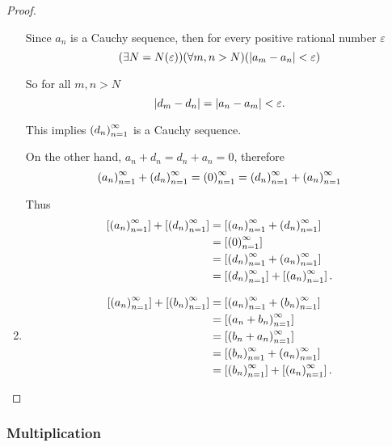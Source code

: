 \begin{proof}
\begin{enumerate}[label={(F\arabic*)},itemsep=0pt]
              Since $a_{n}$ is a Cauchy sequence, then for every positive rational number $\varepsilon$
              \[
                  (\exists N=N(\varepsilon))(\forall m, n > N)(\left\vert{a_{m} - a_{n}}\right\vert < \varepsilon)
              \]

              So for all $m, n > N$
              \[
                  \left\vert{d_{m} - d_{n}}\right\vert = \left\vert{a_{n} - a_{m}}\right\vert < \varepsilon.
              \]

              This implies ${\left({d_{n}}\right)}^{\infty}_{n=1}$ is a Cauchy sequence.

              On the other hand, $a_{n} + d_{n} = d_{n} + a_{n} = 0$, therefore
              \[
                  {\left({a_{n}}\right)}^{\infty}_{n=1} + {\left({d_{n}}\right)}^{\infty}_{n=1} = {\left({0}\right)}^{\infty}_{n=1} = {\left({d_{n}}\right)}^{\infty}_{n=1} + {\left({a_{n}}\right)}^{\infty}_{n=1}
              \]

              Thus
              \begin{align*}
                  \left[{{\left({a_{n}}\right)}^{\infty}_{n=1}}\right] + \left[{{\left({d_{n}}\right)}^{\infty}_{n=1}}\right] & = \left[{{\left({a_{n}}\right)}^{\infty}_{n=1} + {\left({d_{n}}\right)}^{\infty}_{n=1}}\right]          \\
                                                            & = \left[{{\left({0}\right)}^{\infty}_{n=1}}\right]                            \\
                                                            & = \left[{{\left({d_{n}}\right)}^{\infty}_{n=1} + {\left({a_{n}}\right)}^{\infty}_{n=1}}\right]          \\
                                                            & = \left[{{\left({d_{n}}\right)}^{\infty}_{n=1}}\right] + \left[{{\left({a_{n}}\right)}^{\infty}_{n=1}}\right].
              \end{align*}
        \item \begin{align*}
                  \left[{{\left({a_{n}}\right)}^{\infty}_{n=1}}\right] + \left[{{\left({b_{n}}\right)}^{\infty}_{n=1}}\right] & = \left[{{\left({a_{n}}\right)}^{\infty}_{n=1} + {\left({b_{n}}\right)}^{\infty}_{n=1}}\right]                  \\
                                                            & = \left[{{\left({a_{n} + b_{n}}\right)}^{\infty}_{n=1}}\right]                        \\
                                                            & = \left[{{\left({b_{n} + a_{n}}\right)}^{\infty}_{n=1}}\right]                        \\
                                                            & = \left[{{\left({b_{n}}\right)}^{\infty}_{n=1} + {\left({a_{n}}\right)}^{\infty}_{n=1}}\right]                  \\
                                                            & = \left[{{\left({b_{n}}\right)}^{\infty}_{n=1}}\right] + \left[{{\left({a_{n}}\right)}^{\infty}_{n=1}}\right].\qedhere
              \end{align*}
    \end{enumerate}
\end{proof}

\subsubsection*{Multiplication}

